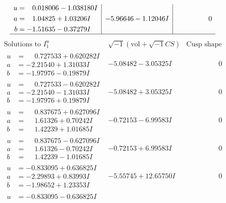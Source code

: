 \documentclass[1p]{elsarticle_modified}
\theoremstyle{definition}
\newcommand{\I}{\sqrt{-1}}
\begin{document}
$$\begin{array}{c|c|c}
\begin{aligned}
u &= \phantom{-}0.018006 - 1.038180 I \\
a &= \phantom{-}1.04825 + 1.03206 I \\
b &= -1.51635 - 0.37279 I\end{aligned}
 & -5.96646 - 1.12046 I & \phantom{-0.000000 } 0\\
 \hline 
 \end{array}$$\newpage$$\begin{array}{c|c|c}  
\text{Solutions to }I^u_{1}& \I (\text{vol} + \sqrt{-1}CS) & \text{Cusp shape}\\
 \hline 
\begin{aligned}
u &= \phantom{-}0.727533 + 0.620282 I \\
a &= -2.21540 + 1.31033 I \\
b &= -1.97976 - 0.19879 I\end{aligned}
 & -5.08482 - 3.05325 I & \phantom{-0.000000 } 0 \\ \hline\begin{aligned}
u &= \phantom{-}0.727533 - 0.620282 I \\
a &= -2.21540 - 1.31033 I \\
b &= -1.97976 + 0.19879 I\end{aligned}
 & -5.08482 + 3.05325 I & \phantom{-0.000000 } 0 \\ \hline\begin{aligned}
u &= \phantom{-}0.837675 + 0.627096 I \\
a &= \phantom{-}1.61326 + 0.70242 I \\
b &= \phantom{-}1.42239 + 1.01685 I\end{aligned}
 & -0.72153 - 6.99583 I & \phantom{-0.000000 } 0 \\ \hline\begin{aligned}
u &= \phantom{-}0.837675 - 0.627096 I \\
a &= \phantom{-}1.61326 - 0.70242 I \\
b &= \phantom{-}1.42239 - 1.01685 I\end{aligned}
 & -0.72153 + 6.99583 I & \phantom{-0.000000 } 0 \\ \hline\begin{aligned}
u &= -0.833095 + 0.636825 I \\
a &= -2.29893 + 0.83993 I \\
b &= -1.98652 + 1.23353 I\end{aligned}
 & -5.55745 + 12.65750 I & \phantom{-0.000000 } 0 \\ \hline\begin{aligned}
u &= -0.833095 - 0.636825 I \\

\end{aligned}
\end{array}$$
\end{document}
